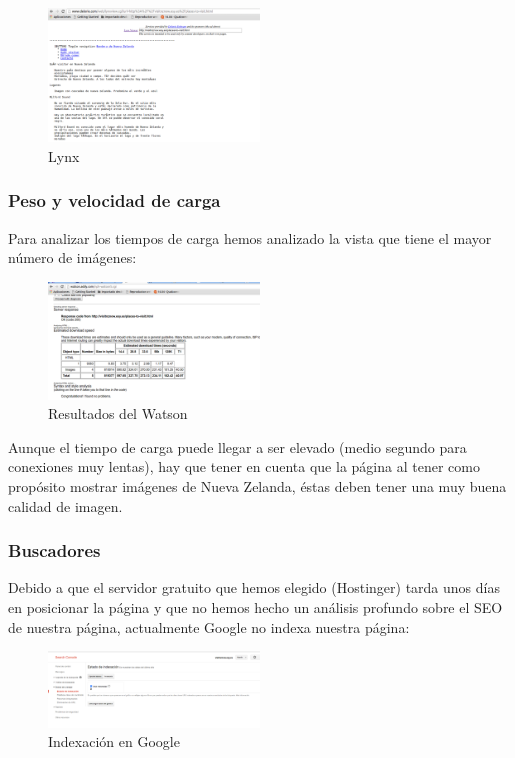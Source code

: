 \begin{figure}[h]
	\centering
	\includegraphics[width=0.50\textwidth]{./Fotos/lynx.png}
	\caption{Lynx}
	\label{fig: Resultados del Lynx}
\end{figure}


\subsubsection{Peso y velocidad de carga}
Para analizar los tiempos de carga hemos analizado la vista que tiene el mayor número de imágenes:
\begin{figure}[h]
	\centering
	\includegraphics[width=0.50\textwidth]{./Fotos/watson.png}
	\caption{Resultados del Watson}
	\label{fig: Resultados del Watson}
\end{figure}
Aunque el tiempo de carga puede llegar a ser elevado (medio segundo para conexiones muy lentas), hay que tener en cuenta que la página al tener como propósito mostrar imágenes de Nueva Zelanda, éstas deben tener una muy buena calidad de imagen.

\subsubsection{Buscadores}
Debido a que el servidor gratuito que hemos elegido (Hostinger) tarda unos días en posicionar la página y que no hemos hecho un análisis profundo sobre el SEO de nuestra página, actualmente Google no indexa nuestra página:

\begin{figure}[h]
	\centering
	\includegraphics[width=0.50\textwidth]{./Fotos/indexacion.png}
	\caption{Indexación en Google}
	\label{fig: Indexación en Google}
\end{figure}


